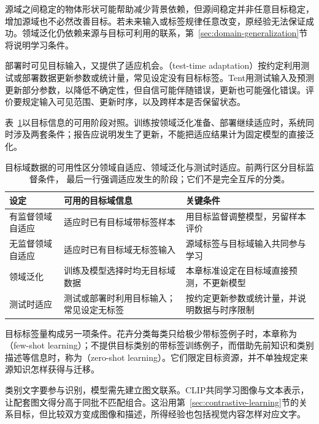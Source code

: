 源域之间稳定的物体形状可能帮助减少背景依赖，但源间稳定并非任意目标稳定，增加源域也不必然改善目标。若未来输入或标签规律任意改变，原经验无法保证成功。领域泛化仍依赖来源与目标可利用的联系，第~\ref{sec:domain-generalization}节将说明学习条件。

部署时可见目标输入，又提供了适应机会。（test-time adaptation）按约定利用测试或部署数据更新参数或统计量，常见设定没有目标标签。Tent用测试输入及预测更新部分参数，以降低不确定性，但自信可能伴随错误，更新也可能强化错误。评价要规定输入可见范围、更新时序，以及跨样本是否保留状态。

表~\ref{tab:domain-transfer-settings}以目标信息的可用阶段对照。训练按领域泛化准备、部署继续适应时，系统同时涉及两套条件；报告应说明发生了更新，不能把适应结果计为固定模型的直接泛化。

\begin{table}[htbp]
  \centering
  \small
  \begin{tabularx}{\linewidth}{@{}lXX@{}}
    \toprule
    \textbf{设定} & \textbf{可用的目标域信息} & \textbf{关键条件} \\
    \midrule
    有监督领域自适应 & 适应时已有目标域带标签样本 & 用目标监督调整模型，另留样本评价 \\
    无监督领域自适应 & 适应时已有目标域无标签输入 & 源域标签与目标域输入共同参与学习 \\
    领域泛化 & 训练及模型选择时均无目标域数据 & 本章标准设定在目标域直接预测，不更新模型 \\
    测试时适应 & 测试或部署时利用目标输入；常见设定无标签 & 按约定更新参数或统计量，并说明数据与时序限制 \\
    \bottomrule
  \end{tabularx}
  \caption{目标域数据的可用性区分领域自适应、领域泛化与测试时适应。前两行区分目标监督条件，
  最后一行强调适应发生的阶段；它们不是完全互斥的分类。}
  \label{tab:domain-transfer-settings}
\end{table}
\FloatBarrier

目标标签量构成另一项条件。花卉分类每类只给极少带标签例子时，本章称为（few-shot learning）；不提供目标类别的带标签训练例子，而借助先前知识和类别描述等信息时，称为（zero-shot learning）。它们限定目标资源，并不单独规定来源知识怎样获得与迁移。

类别文字要参与识别，模型需先建立图文联系。CLIP共同学习图像与文本表示，让配套图文得分高于同批不匹配组合。这沿用第~\ref{sec:contrastive-learning}节的关系目标，但比较双方变成图像和描述，所得经验也包括视觉内容怎样对应文字。

